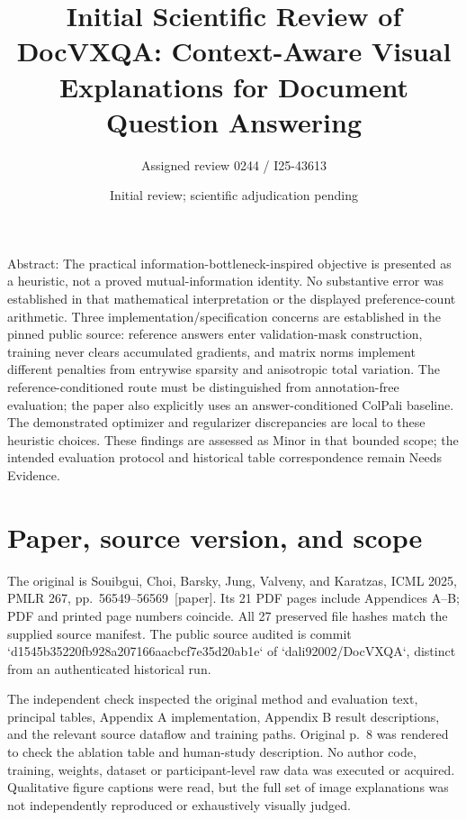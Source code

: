 \documentclass[10pt]{article}
\title{Initial Scientific Review of
DocVXQA: Context-Aware Visual Explanations for Document Question Answering}
\author{Assigned review 0244 / I25-43613}
\date{Initial review; scientific adjudication pending}
\begin{document}
\maketitle
Abstract: The practical information-bottleneck-inspired objective is presented as a heuristic, not a proved mutual-information identity. No substantive error was established in that mathematical interpretation or the displayed preference-count arithmetic. Three implementation/specification concerns are established in the pinned public source: reference answers enter validation-mask construction, training never clears accumulated gradients, and matrix norms implement different penalties from entrywise sparsity and anisotropic total variation. The reference-conditioned route must be distinguished from annotation-free evaluation; the paper also explicitly uses an answer-conditioned ColPali baseline. The demonstrated optimizer and regularizer discrepancies are local to these heuristic choices. These findings are assessed as Minor in that bounded scope; the intended evaluation protocol and historical table correspondence remain Needs Evidence.\par
\section*{Paper, source version, and scope}
The original is Souibgui, Choi, Barsky, Jung, Valveny, and Karatzas, ICML 2025, PMLR 267, pp. 56549–56569 [paper]. Its 21 PDF pages include Appendices A–B; PDF and printed page numbers coincide. All 27 preserved file hashes match the supplied source manifest. The public source audited is commit `d1545b35220fb928a207166aacbcf7e35d20ab1e` of `dali92002/DocVXQA`, distinct from an authenticated historical run.\par
The independent check inspected the original method and evaluation text, principal tables, Appendix A implementation, Appendix B result descriptions, and the relevant source dataflow and training paths. Original p. 8 was rendered to check the ablation table and human-study description. No author code, training, weights, dataset or participant-level raw data was executed or acquired. Qualitative figure captions were read, but the full set of image explanations was not independently reproduced or exhaustively visually judged.\par
\end{document}
